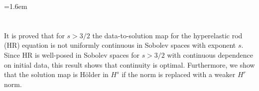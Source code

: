 \documentclass[a0,portrait]{a0poster}
\begin{document}
   
   \begin{multicols}{3}

      \baselineskip=1.6em



\vspace{-2.0 cm}






\section*{}


It is proved that for $s > 3/2$
the data-to-solution map for the hyperelastic rod (HR) equation is not uniformly
continuous in Sobolev spaces with exponent $s$. Since HR is well-posed in Sobolev
spaces for $s > 3/2$ with continuous dependence on initial data, this result shows
that continuity is optimal. Furthermore, we show that the solution map is H\"older
in $H^s$ if the norm is replaced with a weaker $H^r$ norm.
 




\section*{}



\end{multicols}
\end{document}
